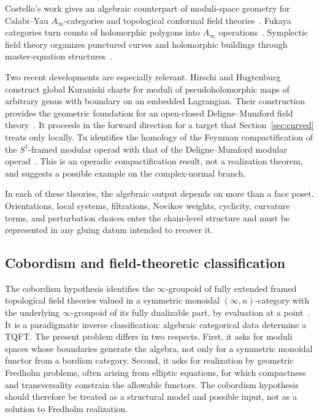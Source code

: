 \documentclass[11pt,letterpaper,twoside]{article}
\theoremstyle{plain}
\theoremstyle{definition}
\theoremstyle{remark}
\let\cite\citep
\newcommand{\Ainf}{A_\infty}
\begin{document}
Costello's work gives an algebraic counterpart of moduli-space geometry for Calabi--Yau \(\Ainf\)-categories and topological conformal field theories~\cite{costello2007}.  Fukaya categories turn counts of holomorphic polygons into \(\Ainf\) operations~\cite{fooo2009,seidel2008}.  Symplectic field theory organizes punctured curves and holomorphic buildings through master-equation structures~\cite{eliashberg2000}.

Two recent developments are especially relevant.  Hirschi and Hugtenburg construct global Kuranishi charts for moduli of pseudoholomorphic maps of arbitrary genus with boundary on an embedded Lagrangian.  Their construction provides the geometric foundation for an open-closed Deligne--Mumford field theory~\cite{hirschihugtenburg2026}.  It proceeds in the forward direction for a target that Section~\ref{sec:curved} treats only locally.  Tu identifies the homology of the Feynman compactification of the \(S^1\)-framed modular operad with that of the Deligne--Mumford modular operad~\cite{tu2026}.  This is an operadic compactification result, not a realization theorem, and suggests a possible example on the complex-normal branch.

In each of these theories, the algebraic output depends on more than a face poset.  Orientations, local systems, filtrations, Novikov weights, cyclicity, curvature terms, and perturbation choices enter the chain-level structure and must be represented in any gluing datum intended to recover it.

\subsection{Cobordism and field-theoretic classification}

The cobordism hypothesis identifies the \(\infty\)-groupoid of fully extended framed topological field theories valued in a symmetric monoidal \((\infty,n)\)-category with the underlying \(\infty\)-groupoid of its fully dualizable part, by evaluation at a point~\cite{lurietqft}.  It is a paradigmatic inverse classification: algebraic categorical data determine a TQFT.  The present problem differs in two respects.  First, it asks for moduli spaces whose boundaries generate the algebra, not only for a symmetric monoidal functor from a bordism category.  Second, it asks for realization by geometric Fredholm problems, often arising from elliptic equations, for which compactness and transversality constrain the allowable functors.  The cobordism hypothesis should therefore be treated as a structural model and possible input, not as a solution to Fredholm realization.
\end{document}
